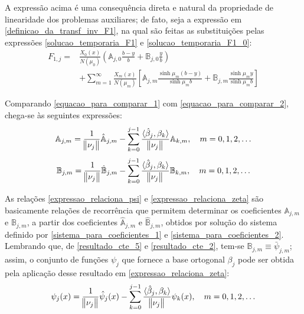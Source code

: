 A expressão acima é uma consequência direta e natural da propriedade de linearidade dos problemas auxiliares; de fato, seja a expressão em \eqref{definicao_da_transf_inv_F1}, na qual são feitas as substituições pelas expressões \eqref{solucao_temporaria_F1} e \eqref{solucao_temporaria_F1_0}:
\begin{align}
F_{1,j} = & \frac{X_0(x)}{N(\mu_0)}\left(\mathbb{A}_{j,0} \frac{b - y}{b} + \mathbb{B}_{j,0}\frac{y}{b}\right) \nonumber \\
& + \sum_{m=1}^\infty \frac{X_m(x)}{N(\mu_m)}\left[\mathbb{A}_{j,m}\frac{\sinh\mu_m (b - y)}{\sinh\mu_m b}  + \mathbb{B}_{j,m}\frac{\sinh\mu_m y}{\sinh\mu_m b}\right]
\label{equacao_para_comparar_2}
\end{align}

Comparando \eqref{equacao_para_comparar_1} com \eqref{equacao_para_comparar_2}, chega-se às seguintes expressões:
\begin{align}
\mathbb{A}_{j,m} = \frac{1}{\norm{\nu_j}} \hat{\mathbb{A}}_{j,m} - \sum_{k=0}^{j-1} \frac{\langle \hat{\beta}_j, \beta_k \rangle}{\norm{\nu_j}} \mathbb{A}_{k,m}, \quad m=0,1,2,\ldots
\label{expressao_relaciona_psi}
\end{align}
\begin{align}
\mathbb{B}_{j,m} = \frac{1}{\norm{\nu_j}} \hat{\mathbb{B}}_{j,m} - \sum_{k=0}^{j-1} \frac{\langle \hat{\beta}_j, \beta_k \rangle}{\norm{\nu_j}} \mathbb{B}_{k,m}, \quad m=0,1,2,\ldots
\label{expressao_relaciona_zeta}
\end{align}

As relações \eqref{expressao_relaciona_psi} e \eqref{expressao_relaciona_zeta} são basicamente relações de recorrência que permitem determinar os coeficientes $\mathbb{A}_{j,m}$ e $\mathbb{B}_{j,m}$, a partir dos coeficientes $\hat{\mathbb{A}}_{j,m}$ e $\hat{\mathbb{B}}_{j,m}$, obtidos por solução do sistema definido por \eqref{sistema_para_coeficientes_1} e \eqref{sistema_para_coeficientes_2}. Lembrando que, de \eqref{resultado_cte_5} e \eqref{resultado_cte_2}, tem-se $\mathbb{B}_{j,m} \equiv \bar{\psi}_{j, m}$; assim, o conjunto de funções $\psi_j$ que fornece a base ortogonal $\beta_j$ pode ser obtida pela aplicação desse resultado em \eqref{expressao_relaciona_zeta}:
\begin{align}
\psi_j(x) = \frac{1}{\norm{\nu_j}} \hat{\psi}_j(x) - \sum_{k=0}^{j-1} \frac{\langle \hat{\beta}_j, \beta_k \rangle}{\norm{\nu_j}} \psi_k(x), \quad m=0,1,2,\ldots \label{expressao_relaciona_phi}
\end{align}

